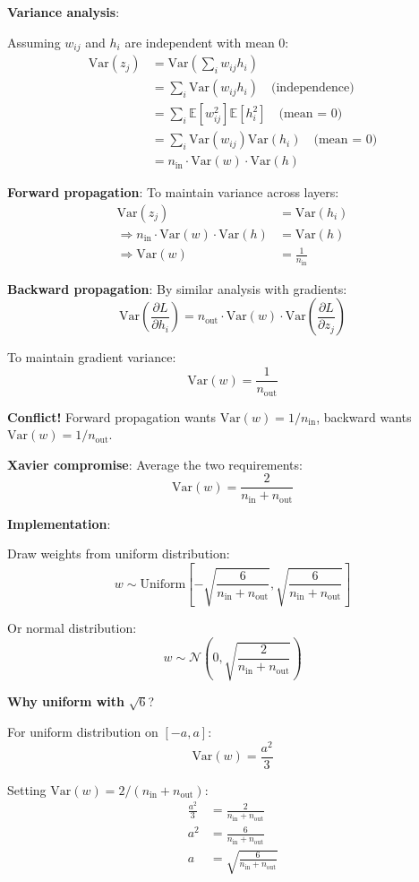 \textbf{Variance analysis}:

Assuming $w_{ij}$ and $h_i$ are independent with mean 0:
\begin{align*}
\text{Var}(z_j) &= \text{Var}\left(\sum_i w_{ij} h_i\right) \\
&= \sum_i \text{Var}(w_{ij} h_i) \quad \text{(independence)} \\
&= \sum_i \mathbb{E}[w_{ij}^2] \mathbb{E}[h_i^2] \quad \text{(mean = 0)} \\
&= \sum_i \text{Var}(w_{ij}) \text{Var}(h_i) \quad \text{(mean = 0)} \\
&= n_{\text{in}} \cdot \text{Var}(w) \cdot \text{Var}(h)
\end{align*}

\textbf{Forward propagation}: To maintain variance across layers:
\begin{align*}
\text{Var}(z_j) &= \text{Var}(h_i) \\
\Rightarrow n_{\text{in}} \cdot \text{Var}(w) \cdot \text{Var}(h) &= \text{Var}(h) \\
\Rightarrow \text{Var}(w) &= \frac{1}{n_{\text{in}}}
\end{align*}

\textbf{Backward propagation}: By similar analysis with gradients:
\[
\text{Var}\left(\frac{\partial L}{\partial h_i}\right) = n_{\text{out}} \cdot \text{Var}(w) \cdot \text{Var}\left(\frac{\partial L}{\partial z_j}\right)
\]

To maintain gradient variance:
\[
\text{Var}(w) = \frac{1}{n_{\text{out}}}
\]

\textbf{Conflict!} Forward propagation wants $\text{Var}(w) = 1/n_{\text{in}}$, backward wants $\text{Var}(w) = 1/n_{\text{out}}$.

\textbf{Xavier compromise}: Average the two requirements:
\[
\text{Var}(w) = \frac{2}{n_{\text{in}} + n_{\text{out}}}
\]

\textbf{Implementation}:

Draw weights from uniform distribution:
\[
w \sim \text{Uniform}\left[-\sqrt{\frac{6}{n_{\text{in}} + n_{\text{out}}}}, \sqrt{\frac{6}{n_{\text{in}} + n_{\text{out}}}}\right]
\]

Or normal distribution:
\[
w \sim \mathcal{N}\left(0, \sqrt{\frac{2}{n_{\text{in}} + n_{\text{out}}}}\right)
\]

\textbf{Why uniform with} $\sqrt{6}$?

For uniform distribution on $[-a, a]$:
\[
\text{Var}(w) = \frac{a^2}{3}
\]

Setting $\text{Var}(w) = 2/(n_{\text{in}} + n_{\text{out}})$:
\begin{align*}
\frac{a^2}{3} &= \frac{2}{n_{\text{in}} + n_{\text{out}}} \\
a^2 &= \frac{6}{n_{\text{in}} + n_{\text{out}}} \\
a &= \sqrt{\frac{6}{n_{\text{in}} + n_{\text{out}}}}
\end{align*}

